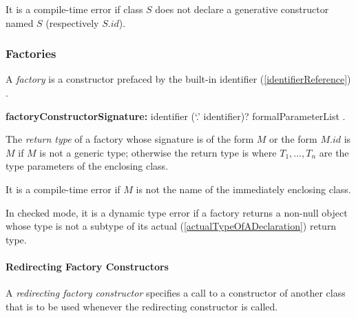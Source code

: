 \documentclass{article}
\begin{document}
\LMHash{}
It is a compile-time error if class $S$ does not declare a generative constructor named $S$ (respectively $S.id$).


\subsubsection{Factories}

\LMHash{}
A {\em factory} is a constructor prefaced by the built-in identifier (\ref{identifierReference}) \FACTORY{}.

\begin{grammar}
{\bf factoryConstructorSignature:}\FACTORY{} identifier (`{\escapegrammar .}' identifier)? formalParameterList
  .
\end{grammar}


\LMHash{}
The {\em return type} of a factory whose signature is of the form \FACTORY{} $M$ or the form \FACTORY{} $M.id$ is $M$ if $M$ is not a generic type;
otherwise the return type is  where $T_1, \ldots, T_n$ are the type parameters of the enclosing class.

\LMHash{}
It is a compile-time error if $M$ is not the name of the immediately enclosing class.

\LMHash{}
In checked mode, it is a dynamic type error if a factory returns a non-null object whose type is not a subtype of its actual (\ref{actualTypeOfADeclaration}) return type.




\paragraph{Redirecting Factory Constructors}

\LMHash{}
A {\em redirecting factory constructor} specifies a call to a constructor of another class that is to be used whenever the redirecting constructor is called.
\end{document}
